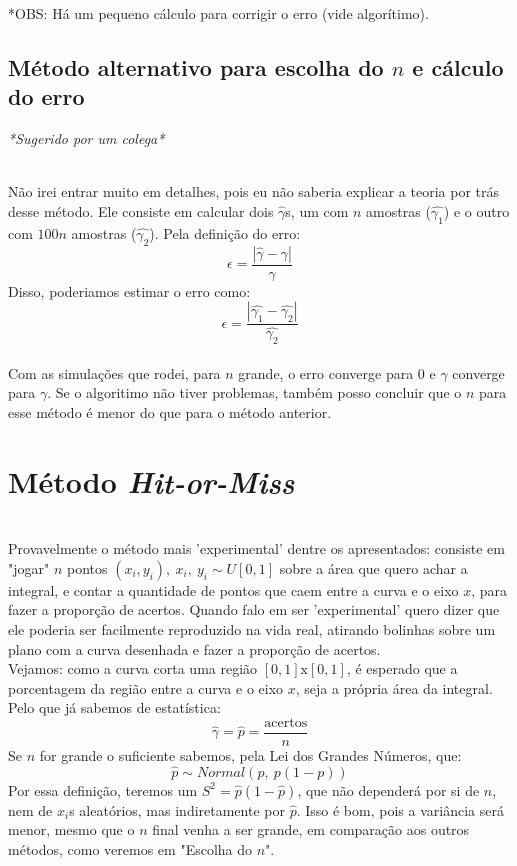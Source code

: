 \documentclass[pt12]{article}
\begin{document}
*OBS: Há um pequeno cálculo para corrigir o erro (vide algorítimo).\\

\subsection{Método alternativo para escolha do $n$ e cálculo do erro}
\begin{center}\textit{*Sugerido por um colega*}\end{center}
\ \\

Não irei entrar muito em detalhes, pois eu não saberia explicar a teoria por trás desse método. Ele consiste em calcular dois $\hat{\gamma}$s, um com $n$ amostras ($\hat{\gamma_1}$) e o outro com $100n$ amostras ($\hat{\gamma_2}$). Pela definição do erro:
$$\epsilon = \frac{|\hat{\gamma}-\gamma|}{\gamma}$$
Disso, poderiamos estimar o erro como:
$$\epsilon = \frac{|\hat{\gamma_1}-\hat{\gamma_2}|}{\hat{\gamma_2}}$$\\
Com as simulações que rodei, para $n$ grande, o erro converge para $0$ e $\hat{\gamma}$ converge para $\gamma$. Se o algoritimo não tiver problemas, também posso concluir que o $n$ para esse método é menor do que para o método anterior. 
\ \\


\section{Método \textit{Hit-or-Miss}}
\ \\

Provavelmente o método mais 'experimental' dentre os apresentados: consiste em "jogar" $n$ pontos $(x_i,y_i),\ x_i,\ y_i \sim U[0,1]$ sobre a área que quero achar a integral, e contar a quantidade de pontos que caem entre a curva e o eixo $x$, para fazer a proporção de acertos. Quando falo em ser 'experimental' quero dizer que ele poderia ser facilmente reproduzido na vida real, atirando bolinhas sobre um plano com a curva desenhada e fazer a proporção de acertos.\\
\indent Vejamos: como a curva corta uma região $[0,1]\text{x}[0,1]$, é esperado que a porcentagem da região entre a curva e o eixo $x$, seja a própria área da integral.
\ \\
Pelo que já sabemos de estatística:
$$\hat{\gamma} = \hat{p} = \frac{\text{acertos}}{n}$$
Se $n$ for grande o suficiente sabemos, pela Lei dos Grandes Números, que:
$$\hat{p}\sim Normal(p,\ p(1-p))$$
Por essa definição, teremos um $S^2 = \hat{p}(1-\hat{p})$, que não dependerá por si de $n$, nem de $x_i$s aleatórios, mas indiretamente por $\hat{p}$. Isso é bom, pois a variância será menor, mesmo que o $n$ final venha a ser grande, em comparação aos outros métodos, como veremos em "Escolha do $n$".
\ \\
\end{document}
